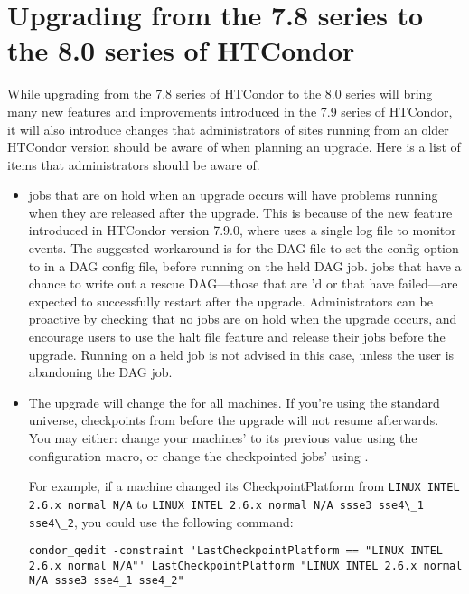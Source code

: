 \section{\label{sec:to-8.0}Upgrading from the 7.8 series to the 8.0 series of HTCondor}

While upgrading from the 7.8 series of HTCondor to the 8.0 series 
will bring many
new features and improvements introduced in the 7.9 series of HTCondor,
it will
also introduce changes that administrators of sites running from an older
HTCondor version should be aware of when planning an upgrade.  
Here is a list of items that administrators should be aware of.

\begin{itemize}

\item {} jobs that are on hold when an upgrade occurs will have
problems running when they are released after the upgrade. This is because of
the new feature introduced in HTCondor version 7.9.0, where 
uses a single log file to monitor events.  The suggested workaround is for the
DAG file to set the config option  to
 in a DAG config file, before running  on the held
DAG job.   jobs that have a chance to write out a rescue
DAG---those that are 'd or that have failed---are expected to
successfully restart after the upgrade. Administrators can be proactive by
checking that no  jobs are on hold when the upgrade occurs, and
encourage users to use the halt file feature and release their 
jobs before the upgrade.  Running  on a held  job is
not advised in this case, unless the user is abandoning the DAG job.

\item The upgrade will change the  for all
machines.  If you're using the standard universe, checkpoints from before
the upgrade will not resume afterwards.  You may either: change your machines'
 to its previous value using the
 configuration macro, or change the checkpointed
jobs'  using .

For example, if a machine changed its CheckpointPlatform
from \verb;LINUX INTEL 2.6.x normal N/A; to 
\verb;LINUX INTEL 2.6.x normal N/A ssse3 sse4\_1 sse4\_2;, you could
use the following command:

\begin{verbatim}
condor_qedit -constraint 'LastCheckpointPlatform == "LINUX INTEL 2.6.x normal N/A"' LastCheckpointPlatform "LINUX INTEL 2.6.x normal N/A ssse3 sse4_1 sse4_2"
\end{verbatim}

\end{itemize}

